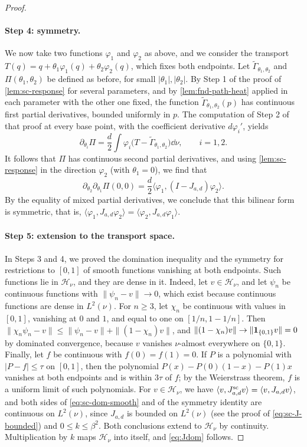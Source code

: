 \begin{proof}
\paragraph{Step 4: symmetry.}
We now take two functions $\varphi_1$ and $\varphi_2$ as above, and we
consider the transport $T(q)=q+\theta_1\varphi_1(q)+\theta_2\varphi_2(q)$, which
fixes both endpoints. Let $\widetilde\Gamma_{\theta_1,\theta_2}$ and
$\Pi(\theta_1,\theta_2)$ be defined as before, for small
$|\theta_1|,|\theta_2|$. By Step 1 of the proof of
\cref{lem:sc-response} for several parameters, and by
\cref{lem:fnd-path-heat} applied in each parameter with the other one
fixed, the function $\widetilde\Gamma_{\theta_1,\theta_2}(p)$ has
continuous first partial derivatives, bounded uniformly in $p$. The
computation of Step 2 of that proof at every base point, with the
coefficient derivative $d\varphi_i'$, yields
\[
 \partial_{\theta_i}\Pi
 =\frac d2\int\varphi_i\bigl(T-\widetilde\Gamma_{\theta_1,\theta_2}\bigr)\dd\nu,
 \qquad i=1,2 .
\]
It follows that $\Pi$ has continuous second partial derivatives, and
using \cref{lem:sc-response} in the direction $\varphi_2$ (with
$\theta_1=0$), we find that
\[
 \partial_{\theta_2}\partial_{\theta_1}\Pi(0,0)
 =\frac d2\langle\varphi_1,(I-J_{a,d})\varphi_2\rangle .
\]
By the equality of mixed partial derivatives, we conclude that this
bilinear form is symmetric, that is, $\langle\varphi_1,J_{a,d}\varphi_2\rangle
=\langle\varphi_2,J_{a,d}\varphi_1\rangle$.

\paragraph{Step 5: extension to the transport space.}
In Steps 3 and 4, we proved the domination inequality and the symmetry
for restrictions to $[0,1]$ of smooth functions vanishing at both
endpoints. Such functions lie in $\mathcal H_\nu$, and they are dense
in it. Indeed, let $v\in\mathcal H_\nu$, and let $\psi_n$ be
continuous functions with $\|\psi_n-v\|\to0$, which exist because
continuous functions are dense in $L^2(\nu)$. For $n\ge3$, let $\chi_n$ be
continuous with values in $[0,1]$, vanishing at $0$ and $1$, and equal
to one on $[1/n,1-1/n]$. Then
$\|\chi_n\psi_n-v\|\le\|\psi_n-v\|+\|(1-\chi_n)v\|$, and
$\|(1-\chi_n)v\|\to\|\mathbf1_{\{0,1\}}v\|=0$ by dominated convergence,
because $v$ vanishes $\nu$-almost everywhere on $\{0,1\}$. Finally, let
$f$ be continuous with $f(0)=f(1)=0$. If $P$ is a polynomial with
$|P-f|\le\tau$ on $[0,1]$, then the polynomial
$P(x)-P(0)(1-x)-P(1)x$ vanishes at both endpoints and is within
$3\tau$ of $f$; by the Weierstrass theorem, $f$ is a uniform limit of
such polynomials. For $v\in\mathcal H_\nu$, we have
$\langle v,J^{\mathrm{sc}}_{a,d}v\rangle=\langle v,J_{a,d}v\rangle$, and both
sides of \eqref{eq:sc-dom-smooth} and of the symmetry identity are
continuous on $L^2(\nu)$, since $J_{a,d}$ is bounded on $L^2(\nu)$ (see
the proof of \eqref{eq:sc-J-bounded}) and $0\le k\le\beta^2$. Both conclusions extend to $\mathcal H_\nu$ by
continuity. Multiplication by $k$ maps $\mathcal H_\nu$ into
itself, and \eqref{eq:Jdom} follows.
\end{proof}

